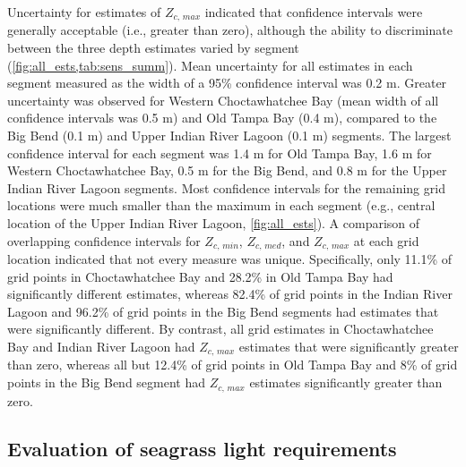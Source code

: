 \documentclass[letterpaper,12pt,oneside]{article}\usepackage[]{graphicx}\usepackage[]{color}
\begin{document}
Uncertainty for estimates of $Z_{c,\,max}$ indicated that confidence intervals were generally acceptable (i.e., greater than zero), although the ability to discriminate between the three depth estimates varied by segment (\cref{fig:all_ests,tab:sens_summ}).  Mean uncertainty for all estimates in each segment measured as the width of a 95\% confidence interval was 0.2 m.  Greater uncertainty was observed for Western Choctawhatchee Bay (mean width of all confidence intervals was 0.5 m) and Old Tampa Bay (0.4 m), compared to the Big Bend (0.1 m) and Upper Indian River Lagoon (0.1 m) segments.  The largest confidence interval for each segment was 1.4 m for Old Tampa Bay, 1.6 m for Western Choctawhatchee Bay, 0.5 m for the Big Bend, and 0.8 m for the Upper Indian River Lagoon segments.  Most confidence intervals for the remaining grid locations were much smaller than the maximum in each segment (e.g., central location of the Upper Indian River Lagoon, \cref{fig:all_ests}).  A comparison of overlapping confidence intervals for $Z_{c,\,min}$, $Z_{c,\,med}$, and $Z_{c,\,max}$ at each grid location indicated that not every measure was unique.  Specifically, only 11.1\% of grid points in Choctawhatchee Bay and 28.2\% in Old Tampa Bay had significantly different estimates, whereas 82.4\% of grid points in the Indian River Lagoon and 96.2\% of grid points in the Big Bend segments had estimates that were significantly different.  By contrast, all grid estimates in Choctawhatchee Bay and Indian River Lagoon had $Z_{c,\,max}$ estimates that were significantly greater than zero, whereas all but 12.4\% of grid points in Old Tampa Bay and 8\% of grid points in the Big Bend segment had $Z_{c,\,max}$ estimates significantly greater than zero. 

\subsection{Evaluation of seagrass light requirements}
\end{document}
